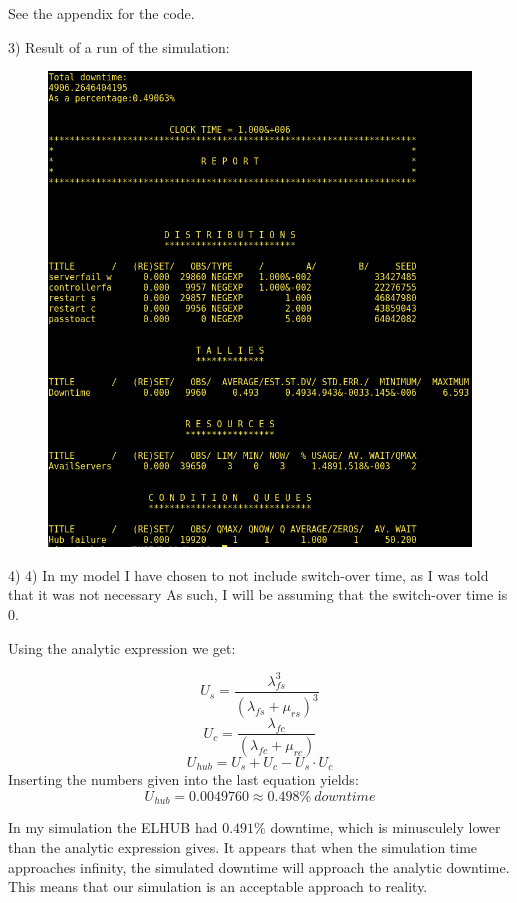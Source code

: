 \documentclass[11pt]{article}
\begin{document}
See the appendix for the code.


3)
Result of a run of the simulation:

\begin{figure}[H]
	\includegraphics[width=\textwidth]{demos_2.png}
	\centering
\end{figure}

4)
4) In my model I have chosen to not include switch-over time, as I was told that it was not necessary As such, I will be assuming that the switch-over time is 0.

Using the analytic expression we get:

$$U_s = \frac{\lambda_{fs}^3}{(\lambda_{fs} + \mu_{rs})^3}$$
$$U_c = \frac{\lambda_{fc}}{(\lambda_{fc} + \mu_{rc})}$$
$$U_{hub} = U_s + U_c - U_s \cdot U_c$$
Inserting the numbers given into the last equation yields:
$$U_{hub} = 0.0049760 \approx 0.498\%\ downtime$$

In my simulation the ELHUB had $0.491\%$ downtime, which is minusculely lower than the analytic expression gives. It appears that when the simulation time approaches infinity, the simulated downtime will approach the analytic downtime. This means that our simulation is an acceptable approach to reality.
\end{document}
